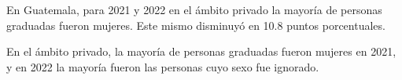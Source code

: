 En Guatemala, para 2021 y 2022 en el ámbito privado la mayoría de personas graduadas fueron mujeres. Este mismo disminuyó en 10.8 puntos porcentuales. 

En el ámbito privado, la mayoría de personas graduadas fueron mujeres en 2021, y en 2022 la mayoría fueron las personas cuyo sexo fue ignorado.